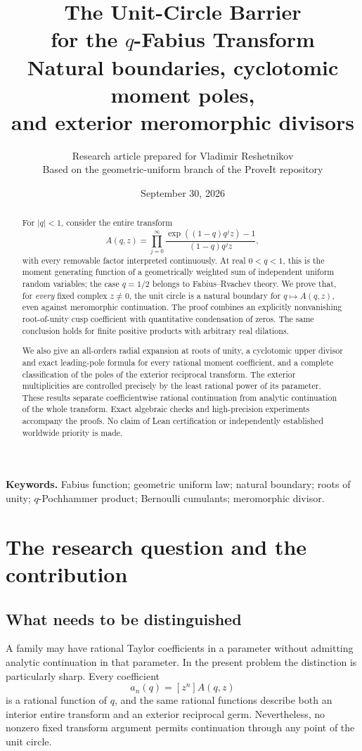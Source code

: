 \documentclass[11pt,a4paper]{article}
\title{\vspace{-10mm}\textbf{The Unit-Circle Barrier\\for the \(q\)-Fabius Transform}\\[5pt]
\large Natural boundaries, cyclotomic moment poles,\\and exterior meromorphic divisors}
\author{Research article prepared for Vladimir Reshetnikov\\
\small Based on the geometric-uniform branch of the ProveIt repository}
\date{September 30, 2026}
\numberwithin{equation}{section}
\theoremstyle{definition}
\theoremstyle{remark}
\begin{document}
\maketitle
\begin{abstract}
For \(|q|<1\), consider the entire transform
\[
 A(q,z)=\prod_{j=0}^{\infty}\frac{\exp((1-q)q^jz)-1}{(1-q)q^jz},
\]
with every removable factor interpreted continuously. At real \(0<q<1\), this is the moment generating function of a geometrically weighted sum of independent uniform random variables; the case \(q=1/2\) belongs to Fabius--Rvachev theory. We prove that, for \emph{every} fixed complex \(z\ne0\), the unit circle is a natural boundary for \(q\mapsto A(q,z)\), even against meromorphic continuation. The proof combines an explicitly nonvanishing root-of-unity cusp coefficient with quantitative condensation of zeros. The same conclusion holds for finite positive products with arbitrary real dilations.

We also give an all-orders radial expansion at roots of unity, a cyclotomic upper divisor and exact leading-pole formula for every rational moment coefficient, and a complete classification of the poles of the exterior reciprocal transform. The exterior multiplicities are controlled precisely by the least rational power of its parameter. These results separate coefficientwise rational continuation from analytic continuation of the whole transform. Exact algebraic checks and high-precision experiments accompany the proofs. No claim of Lean certification or independently established worldwide priority is made.
\end{abstract}
\vspace{3pt}
\noindent\textbf{Keywords.} Fabius function; geometric uniform law; natural boundary; roots of unity; \(q\)-Pochhammer product; Bernoulli cumulants; meromorphic divisor.
\clearpage
\begingroup\small\setlength{\parskip}{0pt}\tableofcontents\endgroup
\clearpage

\section{The research question and the contribution}
\subsection{What needs to be distinguished}
A family may have rational Taylor coefficients in a parameter without admitting analytic continuation in that parameter. In the present problem the distinction is particularly sharp. Every coefficient
\[
 a_n(q)=[z^n]A(q,z)
\]
is a rational function of \(q\), and the same rational functions describe both an interior entire transform and an exterior reciprocal germ. Nevertheless, no nonzero fixed transform argument permits continuation through any point of the unit circle.
\end{document}
